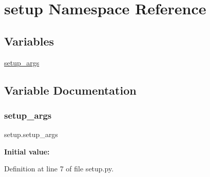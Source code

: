 \hypertarget{namespacesetup}{}\section{setup Namespace Reference}
\label{namespacesetup}
\subsection*{Variables}
\begin{DoxyCompactItemize}
\item 
\mbox{\hyperlink{namespacesetup_a504ffa482edfe0eff08f64b2f5dff0e9}{setup\+\_\+args}}
\end{DoxyCompactItemize}


\subsection{Variable Documentation}
\mbox{\label{namespacesetup_a504ffa482edfe0eff08f64b2f5dff0e9}} 
\subsubsection{\texorpdfstring{setup\+\_\+args}{setup\_args}}
{\footnotesize\ttfamily setup.\+setup\+\_\+args}

{\bfseries Initial value\+:}
\begin{DoxyCode}{0}
\end{DoxyCode}


Definition at line 7 of file setup.\+py.

